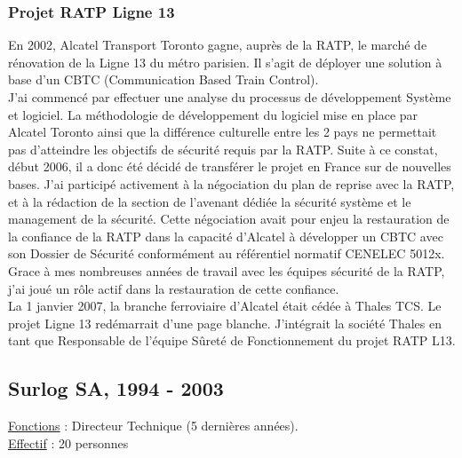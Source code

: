 \documentclass[a4paper,12pt]{article}
\begin{document}
\subsubsection{Projet RATP Ligne 13}
En 2002, Alcatel Transport Toronto gagne, aupr\`es de la RATP, le
march\'e de r\'enovation de la Ligne 13 du m\'etro parisien. Il s'agit
de d\'eployer une solution \`a base d'un CBTC (Communication Based
Train Control).
\\
J'ai commenc\'e par effectuer une analyse du processus
de d\'eveloppement Syst\`eme et logiciel. La m\'ethodologie de
d\'eveloppement du logiciel mise en place par Alcatel Toronto ainsi
que la diff\'erence culturelle entre les 2 pays ne permettait pas
d'atteindre les objectifs de s\'ecurit\'e requis par la RATP.  Suite \`a
ce constat, d\'ebut 2006, il a donc \'et\'e d\'ecid\'e de transf\'erer le
projet en France sur de nouvelles bases. J'ai particip\'e activement \`a
la n\'egociation du plan de reprise avec la RATP, et \`a la r\'edaction de
la section de l'avenant d\'edi\'ee la s\'ecurit\'e syst\`eme et le
management de la s\'ecurit\'e.  Cette n\'egociation avait pour enjeu la
restauration de la confiance de la RATP dans la capacit\'e d'Alcatel
\`a d\'evelopper un CBTC avec son Dossier de S\'ecurit\'e
conform\'ement au r\'ef\'erentiel normatif CENELEC 5012x. Grace \`a
mes nombreuses ann\'ees de travail avec les \'equipes s\'ecurit\'e de
la RATP, j'ai jou\'e un r\^ole actif dans la restauration de cette
confiance. 
\\
La 1 janvier 2007, la branche ferroviaire d'Alcatel \'etait
c\'ed\'ee \`a Thales TCS. Le projet Ligne 13 red\'emarrait d'une page
blanche. J'int\'egrait la soci\'et\'e Thales en tant que Responsable
de l'\'equipe S\^uret\'e de Fonctionnement du projet RATP L13.


\subsection{Surlog SA, 1994 - 2003}
\hspace{-0.6cm}\underline{Fonctions} : Directeur Technique (5 derni\`eres ann\'ees).
\\
\underline{Effectif} : 20 personnes
\\
\end{document}
